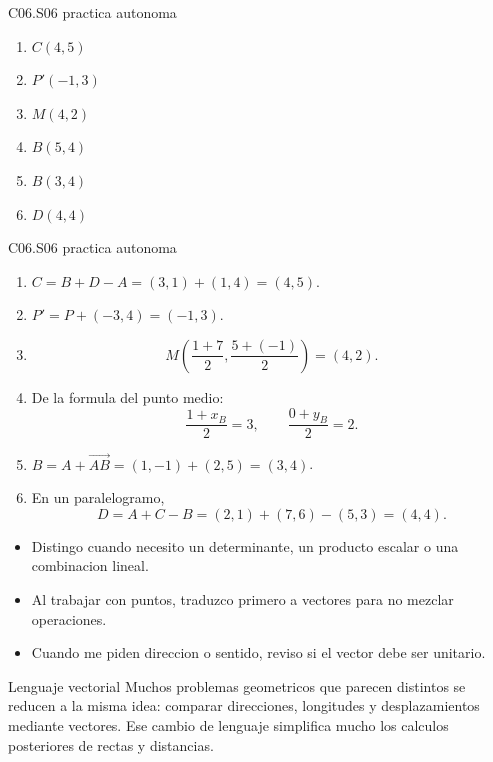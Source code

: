 \begin{shortanswer}{C06.S06 practica autonoma}
\begin{enumerate}[label=\textbf{PX-C06.S06-\arabic*:}, leftmargin=*]
  \item \(C(4,5)\)
  \item \(P'(-1,3)\)
  \item \(M(4,2)\)
  \item \(B(5,4)\)
  \item \(B(3,4)\)
  \item \(D(4,4)\)
\end{enumerate}
\end{shortanswer}

\begin{fullsolution}{C06.S06 practica autonoma}
\begin{enumerate}[label=\textbf{PX-C06.S06-\arabic*:}, leftmargin=*]
  \item \(C=B+D-A=(3,1)+(1,4)=(4,5)\).
  \item \(P'=P+(-3,4)=(-1,3)\).
  \item
  \[
  M\left(\frac{1+7}{2},\frac{5+(-1)}{2}\right)=(4,2).
  \]
  \item De la formula del punto medio:
  \[
  \frac{1+x_B}{2}=3,\qquad \frac{0+y_B}{2}=2.
  \]
  \item \(B=A+\overrightarrow{AB}=(1,-1)+(2,5)=(3,4)\).
  \item En un paralelogramo,
  \[
  D=A+C-B=(2,1)+(7,6)-(5,3)=(4,4).
  \]
\end{enumerate}
\end{fullsolution}

\begin{selfcheck}
\begin{itemize}
  \item Distingo cuando necesito un determinante, un producto escalar o una combinacion lineal.
  \item Al trabajar con puntos, traduzco primero a vectores para no mezclar operaciones.
  \item Cuando me piden direccion o sentido, reviso si el vector debe ser unitario.
\end{itemize}
\end{selfcheck}

\begin{extension}{Lenguaje vectorial}
Muchos problemas geometricos que parecen distintos se reducen a la misma idea: comparar
direcciones, longitudes y desplazamientos mediante vectores. Ese cambio de lenguaje simplifica
mucho los calculos posteriores de rectas y distancias.
\end{extension}
